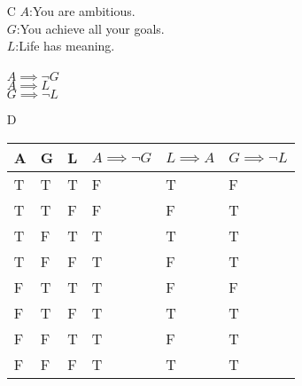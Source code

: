 \documentclass{article}
\begin{document}
\begin{enumerate}
	\item[C]
		$A$:You are ambitious.\\
		$G$:You achieve all your goals.\\
		$L$:Life has meaning.\\
		\\
		$A \implies \lnot G$\\
		\underline{$A \implies L$}\\
		$G \implies \lnot L$
	\item[D]
		\begin{tabular}{l | l | l || l | l || l}
			A & G & L & $A \implies \lnot G$ & $L \implies A$ & $G \implies \lnot L$\\ \hline
			T & T & T & F & T & F\\
			T & T & F & F & F & T\\
			T & F & T & T & T & T\\
			T & F & F & T & F & T\\
			F & T & T & T & F & F\\
			F & T & F & T & T & T\\
			F & F & T & T & F & T\\
			F & F & F & T & T & T\\
		\end{tabular}
		\\\\


\end{enumerate}
\end{document}

